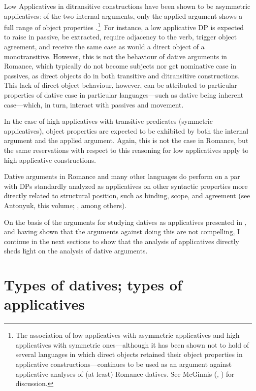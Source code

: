 \documentclass[output=paper,colorlinks,citecolor=brown,nonflat]{./langscibook}
\begin{document}
Low Applicatives in ditransitive constructions have been shown to be asymmetric applicatives:  of the two internal arguments, only the applied argument shows a full range of object properties \citep[203]{Pylkkänen2000}.\footnote{The association of low applicatives with asymmetric applicatives and high applicatives with symmetric ones—although it has been shown not to hold of several languages in which direct objects retained their object properties in applicative constructions—continues to be used as an argument against applicative analyses of (at least) Romance datives. See McGinnis (\citeyear{McGinnis2004}, \citeyear{McGinnis2008}) for discussion.}~For instance, a low applicative DP is expected to raise in passive, be extracted, require adjacency to the verb, trigger object agreement, and receive the same case as would a direct object of a monotransitive. However, this is not the behaviour of dative arguments in Romance, which typically do not become subjects nor get nominative case in passives, as direct objects do in both transitive and ditransitive constructions. This lack of direct object behaviour, however, can be attributed to particular properties of dative case in particular languages—such as dative being inherent case—which, in turn, interact with passives and movement.  

In the case of high applicatives with transitive predicates (symmetric applicatives), object properties are expected to be exhibited by both the internal argument and the applied argument. Again, this is not the case in Romance, but the same reservations with respect to this reasoning for low applicatives apply to high applicative constructions. 

Dative arguments in Romance and many other languages do perform on a par with DPs standardly analyzed as applicatives on other syntactic properties more directly related to structural position, such as  binding, scope, and agreement (see Antonyuk, this volume; \citealt{BonehNash2017, Bruening2010Ditrans, Cuervo2003, Demonte1995, Pineda2016}, among others). 

On the basis of the arguments for studying datives as applicatives presented in , and having shown that the arguments against doing this are not compelling, I continue in the next sections to show that the analysis of applicatives directly sheds light on the analysis of dative arguments.

\section{Types of datives; types of applicatives}\label{sec:cuervo:3}
\end{document}

